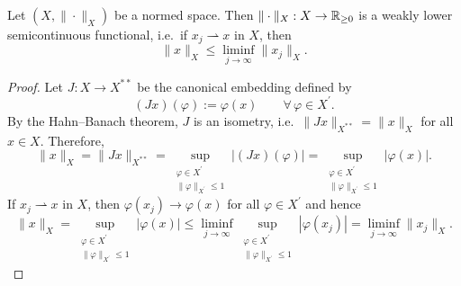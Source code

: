 \begin{lemma}\label{lem:normwlsc}
	Let $(X,\|\cdot\|_X)$ be a normed space. Then $\|\cdot\|_X:X\to {\mathbb R}_{\ge 0}$ is a weakly lower semicontinuous functional, i.e.\ if $x_j\rightharpoonup x$ in $X$, then
	\begin{equation*}
		\|x\|_X \le \liminf_{j\to\infty}\|x_j\|_X.
	\end{equation*}
\end{lemma}
\begin{proof}
	Let $J:X\to X^{**}$ be the canonical embedding defined by
	\begin{equation*}
		(Jx)(\varphi):=\varphi(x)\qquad \forall\, \varphi\in X^\prime.
	\end{equation*}
	By the Hahn--Banach theorem, $J$ is an isometry, i.e.\ $\|Jx\|_{X^{**}}=\|x\|_X$ for all $x\in X$.
	Therefore,
	\begin{equation*}
		\|x\|_X
		=\|Jx\|_{X^{**}}
		=\sup_{\substack{\varphi\in X^\prime\\ \|\varphi\|_{X^\prime}\le 1}} |(Jx)(\varphi)|
		=\sup_{\substack{\varphi\in X^\prime\\ \|\varphi\|_{X^\prime}\le 1}} |\varphi(x)|.
	\end{equation*}
	If $x_j\rightharpoonup x$ in $X$, then $\varphi(x_j)\to\varphi(x)$ for all $\varphi\in X^\prime$ and hence
	\begin{equation*}
		\|x\|_X
		= \sup_{\substack{\varphi\in X^\prime\\ \|\varphi\|_{X^\prime}\le 1}} |\varphi(x)|
		\le \liminf_{j\to\infty}\sup_{\substack{\varphi\in X^\prime\\ \|\varphi\|_{X^\prime}\le 1}}|\varphi(x_j)|
		= \liminf_{j\to\infty}\|x_j\|_X.
	\end{equation*}
\end{proof}

